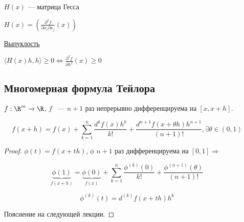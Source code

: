 $H(x)$ --- матрица Гесса 

$H(x) = (\frac{\partial ^ 2 f}{\partial x_i \partial x_j}(x))$

\underline{Выпуклость}

$\langle H(x) h, h \rangle \geqslant 0 \Longleftrightarrow \frac{\partial ^2 f}{\partial h^2}(x) \geqslant 0$

\subsection{Многомерная формула Тейлора}

\begin{theorem}
    $f : \R ^ m \to \R$, $f$ ~--- $n + 1$ раз непрерывно дифференцируема на $[x, x + h]$.

	\[
		f(x + h) = f(x) + \sum_{k = 1} ^ n \frac{d ^ k f(x) h ^ k}{k !} + \frac{d ^ {n + 1} f(x + \theta h) h ^ {n + 1}}{(n + 1)!}, \exists \theta \in (0, 1)
	\]
\end{theorem}

\begin{proof}
    $\phi(t) = f(x + th)$, $\phi$ $n + 1$ раз дифференцируема на $[0, 1] \Rightarrow$

	\[
		\underbrace{\phi(1)}_{f(x + h)} = \underbrace{\phi(0)}_{f(x)} + \sum_{k = 1} ^ n \frac{\phi^{(k)} (0)}{k !} + \frac{\phi^{(n + 1)}(\theta)}{(n + 1)!}
	\]


    \[
        \phi^{(k)}(t) = d^{(k)} f(x + th) h ^ k
    \]

    Пояснение на следующей лекции.
\end{proof}
